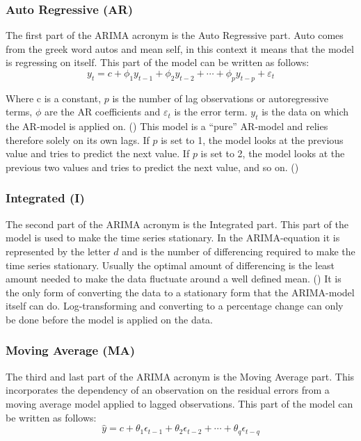 \subsubsection{Auto Regressive (AR)}\label{AutoRegressiveTheory}
The first part of the ARIMA acronym is the Auto Regressive part. Auto comes from the greek word autos and mean self, in this context it means that the model is regressing on itself. This part of the model can be written as follows:
\begin{equation}
y_{t} = c + \phi_{1}y_{t-1} + \phi_{2}y_{t-2} + \cdots + \phi_{p}y_{t-p} + \varepsilon_{t}
\end{equation}

Where c is a constant, $p$ is the number of lag observations or autoregressive terms, $\phi$ are the AR coefficients and $\varepsilon_{t}$ is the error term. $y_{t}$ is the data on which the AR-model is applied on. (\cite{oracle_ARIMA}) This model is a ``pure'' AR-model and relies therefore solely on its own lags. If $p$ is set to 1, the model looks at the previous value and tries to predict the next value. If $p$ is set to 2, the model looks at the previous two values and tries to predict the next value, and so on. (\cite{artley_2022})


\subsubsection{Integrated (I)}\label{IntegratedTheory}
The second part of the ARIMA acronym is the Integrated part. This part of the model is used to make the time series stationary. In the ARIMA-equation it is represented by the letter $d$ and is the number of differencing required to make the time series stationary. Usually the optimal amount of differencing is the least amount needed to make the data fluctuate around a well defined mean. (\cite{nau_2019}) It is the only form of converting the data to a stationary form that the ARIMA-model itself can do. Log-transforming and converting to a percentage change can only be done before the model is applied on the data. 

\subsubsection{Moving Average (MA)}\label{MovingAverageTheory}
The third and last part of the ARIMA acronym is the Moving Average part. This incorporates the dependency of an observation on the residual errors from a moving average model applied to lagged observations. \parencite{hayes_2019} This part of the model can be written as follows:
\begin{equation}
\hat{y} = c + \theta_1\epsilon_{t-1} + \theta_2\epsilon_{t-2} + \cdots + \theta_q\epsilon_{t-q}
\end{equation}

